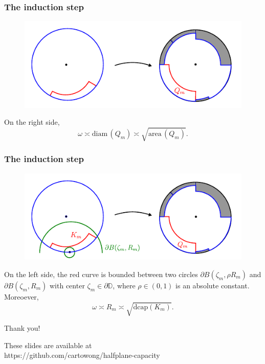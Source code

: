 \documentclass[xcolor=pdftex,dvipsnames,table]{beamer}
\newcommand{\bbD}{\mathbb{D}}
\newcommand{\go}{\omega}
\newcommand{\gz}{\zeta}
\newcommand{\area}{\text{area}\,}
\newcommand{\diam}{\text{diam}\,}
\newcommand{\dcap}{\text{dcap}}
\theoremstyle{definition}
\begin{document}
\begin{frame}
  \frametitle{The induction step}
  \begin{figure}
    \includegraphics[scale=1]{figures/removeOneSquare_03.pdf}
  \end{figure}
  On the right side,
  \[
      \go \asymp \diam(Q_m) \asymp \sqrt{\area(Q_m)}.
  \]
\end{frame}

\begin{frame}
  \frametitle{The induction step}
  \begin{figure}
    \includegraphics[scale=1]{figures/removeOneSquare_04.pdf}
  \end{figure}
  On the left side, the red curve is bounded between two circles $\partial B(\gz_m, \rho R_m)$ and $\partial B(\gz_m, R_m)$
  with center $\gz_m \in \partial \bbD$, where {\color{blue} $\rho \in (0,1)$ is an absolute constant}. Moreoever,
  \[
      \go \asymp R_m \asymp \sqrt{\dcap(K_m)}.
  \]
\end{frame}

\begin{frame}
  \begin{center}
    \huge{Thank you!}
  \end{center}
  \vspace{.2in}
  These slides are available at\\
  {\color{blue} https://github.com/cartowong/halfplane-capacity}  
\end{frame}
\end{document}
